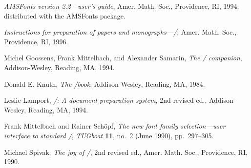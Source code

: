 \documentclass[leqno,titlepage,openany]{amsldoc}
\newcommand{\booktitle}[1]{\textit{#1}}
\newcommand{\journalname}[1]{\textit{#1}}
\begin{document}
\begin{thebibliography}{9}

\booktitle{AMSFonts version \textup{2.2}---user's guide},
Amer. Math. Soc., Providence, RI, 1994; distributed
with the AMSFonts package.

\booktitle{Instructions for preparation of
papers and monographs---\amslatex/},
Amer. Math. Soc., Providence, RI, 1996.

 Michel Goossens, Frank Mittelbach, and Alexander Samarin,
\booktitle{The \latex/ companion}, Addison-Wesley, Reading, MA, 1994.

 Donald E. Knuth, \booktitle{The \tex/book},
Addison-Wesley, Reading, MA, 1984.

 Leslie Lamport, \booktitle{\latex/: A document preparation
system}, 2nd revised ed., Addison-Wesley, Reading, MA, 1994.

 Frank Mittelbach and Rainer Sch\"opf,
\textit{The new font family selection---user
interface to standard \latex/}, \journalname{TUGboat} \textbf{11},
no.~2 (June 1990), pp.~297--305.

 Michael Spivak, \booktitle{The joy of \tex/}, 2nd revised ed.,
Amer. Math. Soc., Providence, RI, 1990.

\end{thebibliography}
\end{document}
